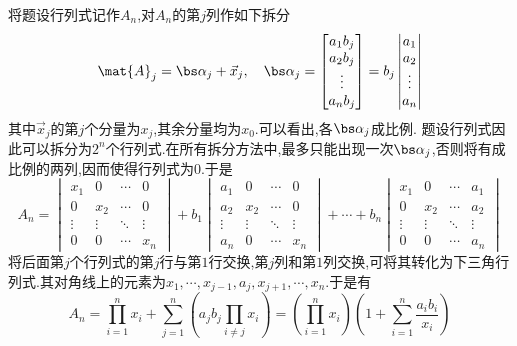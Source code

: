 \documentclass{ctexart}
\begin{document}
\begin{solution}
    将题设行列式记作$A_n$,对$A_n$的第$j$列作如下拆分
    \[\mat{A}_j=\bs\alpha_j+\vec{x}_j,\quad\bs\alpha_j=\begin{bmatrix}
        a_1b_j\\
        a_2b_j\\
        \vdots\\
        a_nb_j
    \end{bmatrix}=b_j\begin{vmatrix}
        a_1\\
        a_2\\
        \vdots\\
        a_n
    \end{vmatrix}\]
    其中$\vec{x}_j$的第$j$个分量为$x_j$,其余分量均为$x_0$.可以看出,各$\bs\alpha_j$成比例.
    题设行列式因此可以拆分为$2^n$个行列式.在所有拆分方法中,最多只能出现一次$\bs\alpha_j$,否则将有成比例的两列,因而使得行列式为$0$.于是
    \[A_n=\begin{vmatrix}
        x_1&0&\cdots&0\\
        0&x_2&\cdots&0\\
        \vdots&\vdots&\ddots&\vdots\\
        0&0&\cdots&x_n
    \end{vmatrix}+b_1\begin{vmatrix}
        a_1&0&\cdots&0\\
        a_2&x_2&\cdots&0\\
        \vdots&\vdots&\ddots&\vdots\\
        a_n&0&\cdots&x_n
    \end{vmatrix}+\cdots+b_n\begin{vmatrix}
        x_1&0&\cdots&a_1\\
        0&x_2&\cdots&a_2\\
        \vdots&\vdots&\ddots&\vdots\\
        0&0&\cdots&a_n
    \end{vmatrix}\]
    将后面第$j$个行列式的第$j$行与第$1$行交换,第$j$列和第$1$列交换,可将其转化为下三角行列式.其对角线上的元素为$x_1,\cdots,x_{j-1},a_j,x_{j+1},\cdots,x_n$.于是有
    \[A_n=\prod_{i=1}^{n}x_i+\sum_{j=1}^{n}\left(a_jb_j\prod_{i\neq j}x_i\right)=\left(\prod_{i=1}^{n}x_i\right)\left(1+\sum_{i=1}^{n}\dfrac{a_ib_i}{x_i}\right)\]
\end{solution}
\end{document}
